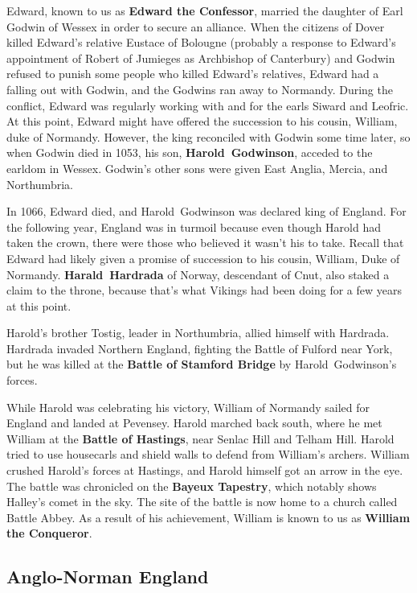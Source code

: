 Edward, known to us as \textbf{Edward the Confessor},
married the daughter of Earl Godwin of Wessex in order to secure an alliance.
When the citizens of Dover killed Edward's relative Eustace of Bolougne
(probably a response to Edward's appointment of Robert of Jumieges as Archbishop of Canterbury)
and Godwin refused to punish some people who killed Edward's relatives,
Edward had a falling out with Godwin, and the Godwins ran away to Normandy.
During the conflict, Edward was regularly working with and for the earls Siward and Leofric.
At this point, Edward might have offered the succession to his cousin, William, duke of Normandy.
However, the king reconciled with Godwin some time later, so when Godwin died in 1053,
his son, \textbf{Harold~Godwinson}, acceded to the earldom in Wessex.
Godwin's other sons were given East Anglia, Mercia, and Northumbria.

In 1066, Edward died, and Harold~Godwinson was declared king of England.
For the following year, England was in turmoil because even though Harold had taken the crown,
there were those who believed it wasn't his to take.
Recall that Edward had likely given a promise of succession to his cousin,
William, Duke of Normandy.
\textbf{Harald~Hardrada} of Norway, descendant of Cnut, also staked a claim to the throne,
because that's what Vikings had been doing for a few years at this point.

Harold's brother Tostig, leader in Northumbria, allied himself with Hardrada.
Hardrada invaded Northern England, fighting the Battle of Fulford near York,
but he was killed at the \textbf{Battle of Stamford Bridge} by Harold~Godwinson's forces.

While Harold was celebrating his victory,
William of Normandy sailed for England and landed at Pevensey.
Harold marched back south, where he met William at the \textbf{Battle of Hastings},
near Senlac Hill and Telham Hill.
Harold tried to use housecarls and shield walls to defend from William's archers.
William crushed Harold's forces at Hastings, and Harold himself got an arrow in the eye.
The battle was chronicled on the \textbf{Bayeux Tapestry},
which notably shows Halley's comet in the sky.
The site of the battle is now home to a church called Battle Abbey.
As a result of his achievement, William is known to us as \textbf{William the Conqueror}.

\subsection*{Anglo-Norman England}

